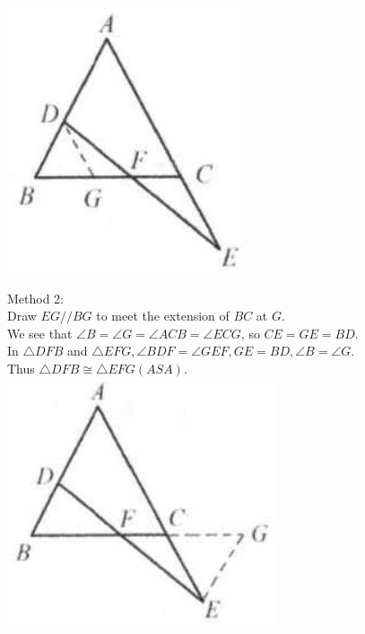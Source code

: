 \documentclass[10pt]{article}
\begin{document}
\includegraphics[max width=\textwidth, center]{2025_04_17_97bc1f7e44d93c271a88g-102(2)}

Method 2:\\
Draw \(E G / / B G\) to meet the extension of \(B C\) at \(G\).\\
We see that \(\angle B=\angle G=\angle A C B=\angle E C G\), so \(C E=G E=B D\).\\
In \(\triangle D F B\) and \(\triangle E F G, \angle B D F=\angle G E F, G E=B D, \angle B=\angle G\).\\
Thus \(\triangle D F B \cong \triangle E F G(A S A)\).\\
\includegraphics[max width=\textwidth, center]{2025_04_17_97bc1f7e44d93c271a88g-102(3)}
\end{document}

